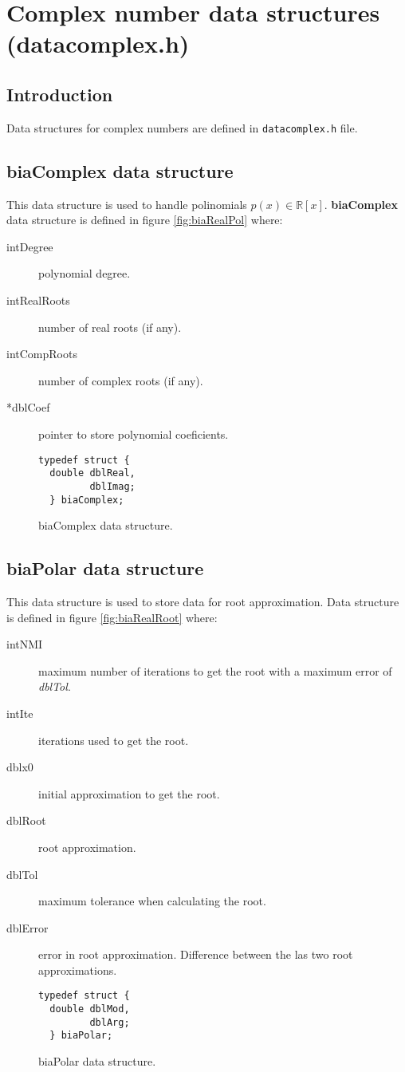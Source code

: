 %
%

\chapter{Complex number data structures (datacomplex.h)}

\section{Introduction}

Data structures for complex numbers are defined in \texttt{datacomplex.h} file.

\section{\textbf{biaComplex} data structure} \label{sec:biaComplex}

This data structure is used to handle polinomials $p(x) \in \mathbb{R}[x]$. \textbf{biaComplex} data structure is defined in figure \ref{fig:biaRealPol} where:

\begin{description}
\item[intDegree] polynomial degree.
\item[intRealRoots] number of real roots (if any).
\item[intCompRoots] number of complex roots (if any).
\item[*dblCoef] pointer to store polynomial coeficients.
\end{description}

\begin{figure}[!h]
\begin{verbatim}
typedef struct {
  double dblReal,
         dblImag;
  } biaComplex;
\end{verbatim}
\caption{biaComplex data structure.} \label{fig:biaComplex}
\end{figure}

\section{\textbf{biaPolar} data structure} \label{sec:biaPolar}

This data structure is used to store data for root approximation. Data structure is defined in figure \ref{fig:biaRealRoot} where:

\begin{description}
\item[intNMI] maximum number of iterations to get the root with a maximum error of \emph{dblTol}.
\item[intIte] iterations used to get the root.
\item[dblx0] initial approximation to get the root.
\item[dblRoot] root approximation.
\item[dblTol] maximum tolerance when calculating the root.
\item[dblError] error in root approximation. Difference between the las two root approximations.
\end{description}

\begin{figure}[!h]
\begin{verbatim}
typedef struct {
  double dblMod,
         dblArg;
  } biaPolar;
\end{verbatim}
\caption{biaPolar data structure.} \label{fig:biaPolar}
\end{figure}

